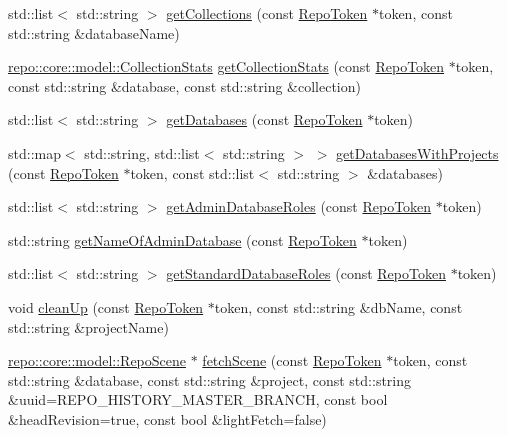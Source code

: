 \begin{DoxyCompactItemize}
\item 
std\+::list$<$ std\+::string $>$ \hyperlink{class_repo_controller_1_1___repo_controller_impl_ae0cdcabbd58286f7d3d0bb9f9961fac4}{get\+Collections} (const \hyperlink{class_repo_controller_1_1_repo_token}{Repo\+Token} $\ast$token, const std\+::string \&database\+Name)
\item 
\hyperlink{classrepo_1_1core_1_1model_1_1_collection_stats}{repo\+::core\+::model\+::\+Collection\+Stats} \hyperlink{class_repo_controller_1_1___repo_controller_impl_a5d1d5b242280cbc54d7bb9f9705e37d7}{get\+Collection\+Stats} (const \hyperlink{class_repo_controller_1_1_repo_token}{Repo\+Token} $\ast$token, const std\+::string \&database, const std\+::string \&collection)
\item 
std\+::list$<$ std\+::string $>$ \hyperlink{class_repo_controller_1_1___repo_controller_impl_a5b814cf8781cfbaa135fb4c1095d15a1}{get\+Databases} (const \hyperlink{class_repo_controller_1_1_repo_token}{Repo\+Token} $\ast$token)
\item 
std\+::map$<$ std\+::string, std\+::list$<$ std\+::string $>$ $>$ \hyperlink{class_repo_controller_1_1___repo_controller_impl_a79bb9b99be1a8aef1accfee709b71b80}{get\+Databases\+With\+Projects} (const \hyperlink{class_repo_controller_1_1_repo_token}{Repo\+Token} $\ast$token, const std\+::list$<$ std\+::string $>$ \&databases)
\item 
std\+::list$<$ std\+::string $>$ \hyperlink{class_repo_controller_1_1___repo_controller_impl_a72b4cbf7b4bc1d9f17ce638152a8a160}{get\+Admin\+Database\+Roles} (const \hyperlink{class_repo_controller_1_1_repo_token}{Repo\+Token} $\ast$token)
\item 
std\+::string \hyperlink{class_repo_controller_1_1___repo_controller_impl_aa1bac682bc4fa699955bf7768d23d731}{get\+Name\+Of\+Admin\+Database} (const \hyperlink{class_repo_controller_1_1_repo_token}{Repo\+Token} $\ast$token)
\item 
std\+::list$<$ std\+::string $>$ \hyperlink{class_repo_controller_1_1___repo_controller_impl_a2f82e03f7d90a152e13fd4ad0e105f27}{get\+Standard\+Database\+Roles} (const \hyperlink{class_repo_controller_1_1_repo_token}{Repo\+Token} $\ast$token)
\item 
void \hyperlink{class_repo_controller_1_1___repo_controller_impl_abeffe6e2eabc53bce17260b4b21724ef}{clean\+Up} (const \hyperlink{class_repo_controller_1_1_repo_token}{Repo\+Token} $\ast$token, const std\+::string \&db\+Name, const std\+::string \&project\+Name)
\item 
\hyperlink{classrepo_1_1core_1_1model_1_1_repo_scene}{repo\+::core\+::model\+::\+Repo\+Scene} $\ast$ \hyperlink{class_repo_controller_1_1___repo_controller_impl_abf64e733912708232475533b46020dee}{fetch\+Scene} (const \hyperlink{class_repo_controller_1_1_repo_token}{Repo\+Token} $\ast$token, const std\+::string \&database, const std\+::string \&project, const std\+::string \&uuid=R\+E\+P\+O\+\_\+\+H\+I\+S\+T\+O\+R\+Y\+\_\+\+M\+A\+S\+T\+E\+R\+\_\+\+B\+R\+A\+N\+C\+H, const bool \&head\+Revision=true, const bool \&light\+Fetch=false)

\end{DoxyCompactItemize}
